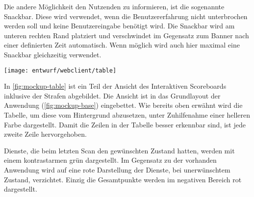 Die andere Möglichkeit den Nutzenden zu informieren, ist die sogenannte Snackbar. Diese wird verwendet, wenn die Benutzererfahrung nicht unterbrochen werden soll und keine Benutzereingabe benötigt wird.
Die Snackbar wird am  unteren rechten Rand platziert und verschwindet im Gegensatz zum Banner nach einer definierten Zeit automatisch. Wenn möglich wird auch hier maximal eine Snackbar gleichzeitig verwendet.

\begin{minipage}{\textwidth}
	\texttt{[image: entwurf/webclient/table]}
	\label{fig:mockup-table}
\end{minipage}

In \autoref{fig:mockup-table} ist ein Teil der Ansicht des Interaktiven Scoreboards inklusive der Strafen abgebildet. Die Ansicht ist in das Grundlayout der Anwendung (\autoref{fig:mockup-base}) eingebettet. Wie bereits oben erwähnt wird die Tabelle, um diese vom Hintergrund abzusetzen, unter Zuhilfenahme einer helleren Farbe dargestellt. Damit die Zeilen in der Tabelle besser erkennbar sind, ist jede zweite Zeile hervorgehoben. 

Dienste, die beim letzten Scan den gewünschten Zustand hatten, werden mit einem kontrastarmen grün dargestellt. Im Gegensatz zu der vorhanden Anwendung wird auf eine rote Darstellung der Dienste, bei unerwünschtem Zustand, verzichtet. Einzig die Gesamtpunkte werden im negativen Bereich rot dargestellt.
